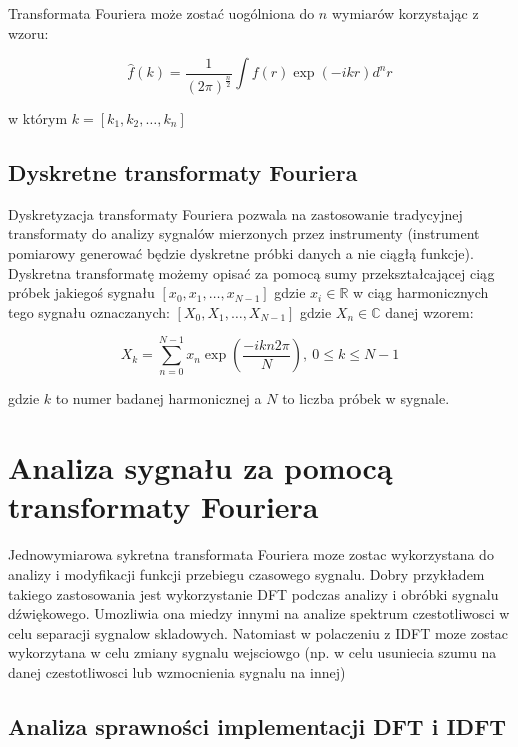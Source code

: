 \documentclass{artikel3}
\begin{document}
Transformata Fouriera może zostać uogólniona do $n$ wymiarów korzystając z wzoru:

\begin{equation}
    \hat{f}(k) = \frac{1}{{(2\pi)}^\frac{n}{2}} \int f(r) \exp{(-ikr)} d^n r
\end{equation}

w którym $k=[k_1,k_2,\ldots, k_n]$

\subsection{Dyskretne transformaty Fouriera}
Dyskretyzacja transformaty Fouriera pozwala na zastosowanie tradycyjnej transformaty do analizy sygnalów mierzonych przez instrumenty (instrument pomiarowy generować będzie dyskretne próbki danych a nie ciągłą funkcje).
Dyskretna transformatę możemy opisać za pomocą sumy przekształcającej ciąg próbek jakiegoś sygnału $[x_0, x_1, \ldots, x_{N-1}]$ gdzie $x_i \in \mathbb{R}$ w ciąg harmonicznych tego sygnału oznaczanych: $[X_0, X_1, \ldots, X_{N-1}]$ gdzie $X_n \in \mathbb{C}$ danej wzorem:

\begin{equation}
    X_k = \sum_{n=0}^{N-1} x_n \exp{\left(\frac{-i k n 2\pi}{N}\right)} , \ 0 \le k \le N - 1
\end{equation}

gdzie $k$ to numer badanej harmonicznej a $N$ to liczba próbek w sygnale.

\section{Analiza sygnału za pomocą transformaty Fouriera}

Jednowymiarowa sykretna transformata Fouriera moze zostac wykorzystana do analizy i modyfikacji funkcji przebiegu czasowego sygnalu.
Dobry przykładem takiego zastosowania jest wykorzystanie DFT podczas analizy i obróbki sygnalu dźwiękowego.
Umozliwia ona miedzy innymi na analize spektrum czestotliwosci w celu separacji sygnalow skladowych. Natomiast w polaczeniu z IDFT moze zostac wykorzytana w celu zmiany sygnalu wejsciowgo (np. w celu usuniecia szumu na danej czestotliwosci lub wzmocnienia sygnalu na innej)

\subsection{Analiza sprawności implementacji DFT i IDFT }
\end{document}
